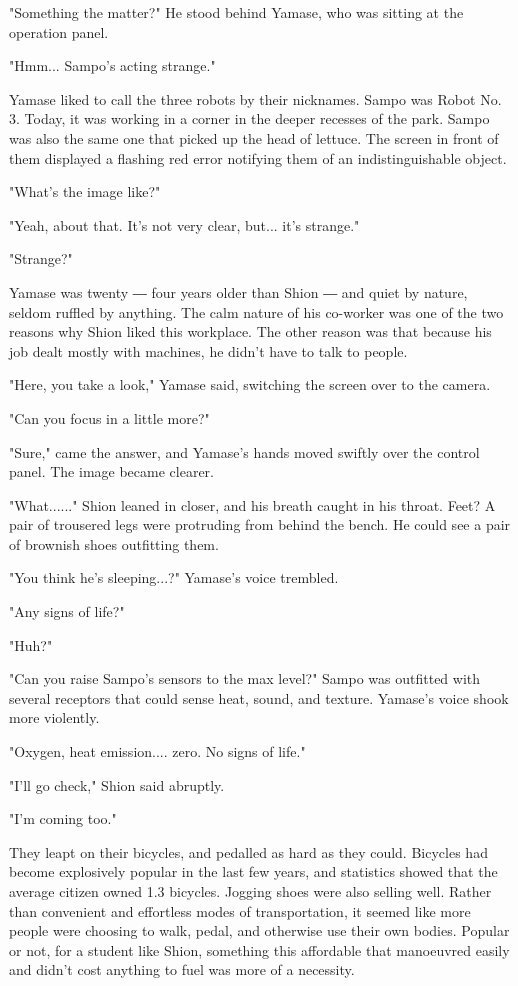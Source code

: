 "Something the matter?" He stood behind Yamase, who was sitting at the
operation panel.

"Hmm... Sampo's acting strange."

Yamase liked to call the three robots by their nicknames. Sampo was
Robot No. 3. Today, it was working in a corner in the deeper recesses of
the park. Sampo was also the same one that picked up the head of
lettuce. The screen in front of them displayed a flashing red error
notifying them of an indistinguishable object.

"What's the image like?"

"Yeah, about that. It's not very clear, but... it's strange."

"Strange?"

Yamase was twenty ― four years older than Shion ― and quiet by nature,
seldom ruffled by anything. The calm nature of his co-worker was one of
the two reasons why Shion liked this workplace. The other reason was
that because his job dealt mostly with machines, he didn't have to talk
to people.

"Here, you take a look," Yamase said, switching the screen over to the
camera.

"Can you focus in a little more?"

"Sure," came the answer, and Yamase's hands moved swiftly over the
control panel. The image became clearer.

"What......" Shion leaned in closer, and his breath caught in his
throat. Feet? A pair of trousered legs were protruding from behind the
bench. He could see a pair of brownish shoes outfitting them.

"You think he's sleeping...?" Yamase's voice trembled.

"Any signs of life?"

"Huh?"

"Can you raise Sampo's sensors to the max level?" Sampo was outfitted
with several receptors that could sense heat, sound, and texture.
Yamase's voice shook more violently.

"Oxygen, heat emission.... zero. No signs of life."

"I'll go check," Shion said abruptly.

"I'm coming too."

They leapt on their bicycles, and pedalled as hard as they could.
Bicycles had become explosively popular in the last few years, and
statistics showed that the average citizen owned 1.3 bicycles. Jogging
shoes were also selling well. Rather than convenient and effortless
modes of transportation, it seemed like more people were choosing to
walk, pedal, and otherwise use their own bodies. Popular or not, for a
student like Shion, something this affordable that manoeuvred easily and
didn't cost anything to fuel was more of a necessity.

